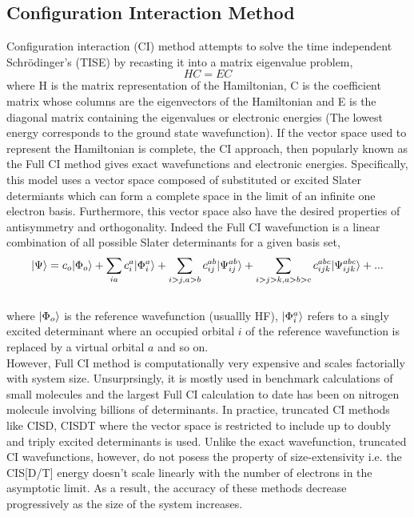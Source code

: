 \subsection{Configuration Interaction Method}
Configuration interaction (CI) method attempts to solve the time independent 
Schr\"odinger's (TISE) by recasting it into a matrix eigenvalue problem, 
\begin{equation}
HC = EC
\end{equation}
where H is the matrix representation of the Hamiltonian, C is the coefficient matrix
whose columns are the eigenvectors of the Hamiltonian and E is the diagonal matrix 
containing the eigenvalues or electronic energies (The lowest energy corresponds to 
the ground state wavefunction). If the vector space used to represent the Hamiltonian 
is complete, the CI approach, then popularly known as the Full CI method gives exact 
wavefunctions and electronic energies. Specifically, this model uses a vector space 
composed of substituted or excited Slater determiants which can form a complete
space in the limit of an infinite one electron basis. Furthermore, this vector space 
also have the desired properties of antisymmetry and orthogonality. Indeed the Full 
CI wavefunction is a linear combination of all possible Slater determinants for a given basis set,
\\
\begin{equation}
| \Psi \rangle = c_o| \Phi_o \rangle + \sum_{ia}{c}_{i}^{a}| {\Phi}^a_i \rangle + \sum_{i>j,a>b}c_{ij}^{ab}| \Psi^{ab}_{ij} \rangle + \sum_{i>j>k,a>b>c}c_{ijk}^{abc}| \Psi^{abc}_{ijk} \rangle + ...
\end{equation}
\\
where $| \Phi_o \rangle$ is the reference wavefunction (usuallly HF), $| {\Phi}^a_i \rangle$ refers to a singly excited determinant where an occupied orbital $i$ of the reference wavefunction is replaced by a virtual orbital $a$
and so on.\\
However, Full CI method is computationally very expensive and scales factorially with 
system size. Unsurprsingly, it is mostly used in benchmark calculations of small molecules and
the largest Full CI calculation to date has been on nitrogen molecule\cite{} involving 
billions of determinants. In practice, truncated CI methods like CISD, CISDT where the vector 
space is restricted to include up to doubly and triply excited determinants 
is used. Unlike the exact wavefunction, truncated CI wavefunctions, however, 
do not posess the property of size-extensivity i.e. the CIS[D/T] energy doesn't scale 
linearly with the number of electrons in the asymptotic limit. As a result,
the accuracy of these methods decrease progressively as the size of the system increases.
